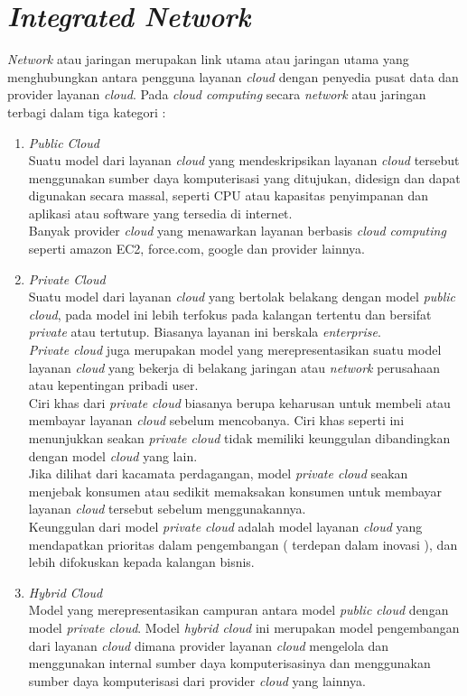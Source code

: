 \section{\textit{Integrated Network}}
\tab \textit{Network} atau jaringan merupakan link utama atau jaringan utama yang menghubungkan antara pengguna layanan \textit{cloud} dengan penyedia pusat data dan provider layanan \textit{cloud}. Pada \textit{cloud computing} secara \textit{network} atau jaringan terbagi dalam tiga kategori :\\
\begin{enumerate}
\item \textit{Public Cloud}\\
Suatu model dari layanan \textit{cloud} yang mendeskripsikan layanan \textit{cloud} tersebut menggunakan sumber daya komputerisasi yang ditujukan, didesign dan dapat digunakan secara massal, seperti CPU atau kapasitas penyimpanan dan aplikasi atau software yang tersedia di internet.\\
Banyak provider \textit{cloud} yang menawarkan layanan berbasis \textit{cloud computing} seperti amazon EC2, force.com, google dan provider lainnya.\\
\item \textit{Private Cloud}\\
Suatu model dari layanan \textit{cloud} yang bertolak belakang dengan model \textit{public cloud}, pada model ini lebih terfokus pada kalangan tertentu dan bersifat \textit{private} atau tertutup. Biasanya layanan ini berskala \textit{enterprise}.\\
\textit{Private cloud} juga merupakan model yang merepresentasikan suatu model layanan \textit{cloud} yang bekerja di belakang jaringan atau \textit{network} perusahaan atau kepentingan pribadi user.\\
Ciri khas dari \textit{private cloud} biasanya berupa keharusan untuk membeli atau membayar layanan \textit{cloud} sebelum mencobanya. Ciri khas seperti ini menunjukkan seakan \textit{private cloud} tidak memiliki keunggulan dibandingkan dengan model \textit{cloud} yang lain.\\
Jika dilihat dari kacamata perdagangan, model \textit{private cloud }seakan menjebak konsumen atau sedikit memaksakan konsumen untuk membayar layanan \textit{cloud} tersebut sebelum menggunakannya.\\
Keunggulan dari model \textit{private cloud} adalah model layanan \textit{cloud} yang mendapatkan prioritas dalam pengembangan ( terdepan dalam inovasi ), dan lebih difokuskan kepada kalangan bisnis.\\
\item \textit{Hybrid Cloud}\\
Model yang merepresentasikan campuran antara model \textit{public cloud} dengan model \textit{private cloud}. Model \textit{hybrid cloud} ini merupakan model pengembangan dari layanan \textit{cloud} dimana provider layanan \textit{cloud} mengelola dan menggunakan internal sumber daya komputerisasinya dan menggunakan sumber daya komputerisasi dari provider \textit{cloud} yang lainnya. \\
\end{enumerate}
